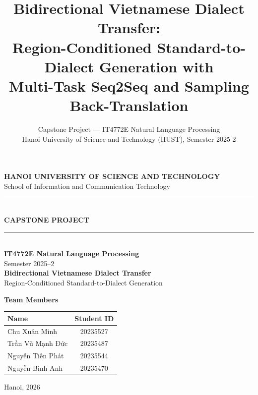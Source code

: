 \documentclass[11pt]{article}
\title{\textbf{Bidirectional Vietnamese Dialect Transfer:\\
Region-Conditioned Standard-to-Dialect Generation with\\
Multi-Task Seq2Seq and Sampling Back-Translation}}
\author{%
  Capstone Project --- IT4772E Natural Language Processing\\
  Hanoi University of Science and Technology (HUST), Semester 2025-2
}
\date{}
\begin{document}
\begin{titlepage}
  \thispagestyle{empty}

  \begin{center}
    {\Large \textbf{HANOI UNIVERSITY OF SCIENCE AND TECHNOLOGY}}\\[0.25cm]
    {\large School of Information and Communication Technology}\\[1.2cm]

    \rule{\linewidth}{0.8pt}\\[0.35cm]
    {\Huge \textbf{CAPSTONE PROJECT}}\\[0.25cm]
    \rule{\linewidth}{0.8pt}\\[1.2cm]

    {\Large \textbf{IT4772E Natural Language Processing}}\\[0.35cm]
    {\large Semester 2025--2}\\[1.4cm]

    {\LARGE \textbf{Bidirectional Vietnamese Dialect Transfer}}\\[0.35cm]
    {\Large Region-Conditioned Standard-to-Dialect Generation}\\[0.2cm]

    \vspace{36pt}
    \begin{minipage}{0.78\linewidth}
      \centering
      {\large \textbf{Team Members}}\\[0.35cm]

      \begin{tabular}{@{}l c@{}}
        \toprule
        \textbf{Name} & \textbf{Student ID} \\
        \midrule
        Chu Xuân Minh       & 20235527 \\
        Trần Vũ Mạnh Đức    & 20235487 \\
        Nguyễn Tiến Phát    & 20235544 \\
        Nguyễn Bình Anh     & 20235470 \\
        \bottomrule
      \end{tabular}
    \end{minipage}

    \vfill

    {\large Hanoi, 2026}
  \end{center}

  \restoregeometry
\end{titlepage}
\end{document}
